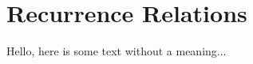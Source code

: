 \documentclass[../main.tex]{subfiles}
\begin{document}
\section{Recurrence Relations}

Hello, here is some text without a meaning...
\end{document}
